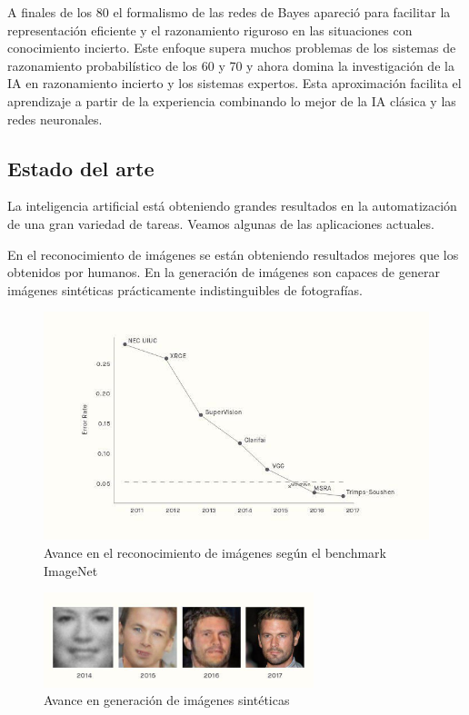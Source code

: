 \documentclass[12pt,a4paper]{article}
\begin{document}
A finales de los 80 el formalismo de las redes de Bayes apareció para facilitar la representación eficiente y el razonamiento riguroso en las situaciones con conocimiento incierto. Este enfoque supera muchos problemas de los sistemas de razonamiento probabilístico de los 60 y 70 y ahora domina la investigación de la IA en razonamiento incierto y los sistemas expertos. Esta aproximación facilita el aprendizaje a partir de la experiencia combinando lo mejor de la IA clásica y las redes neuronales.
\subsection{Estado del arte}
La inteligencia artificial está obteniendo grandes resultados en la automatización de una gran variedad de tareas. Veamos algunas de las aplicaciones actuales.

En el reconocimiento de imágenes se están obteniendo resultados mejores que los obtenidos por humanos. En la generación de imágenes son capaces de generar imágenes sintéticas prácticamente indistinguibles de fotografías.

\begin{figure}[h!]
 \centering
 \includegraphics[width=1.0\textwidth]{grafica.jpg}
 \caption{Avance en el reconocimiento de imágenes según el benchmark ImageNet}
\end{figure}

\begin{figure}[h!]
 \centering
 \includegraphics[width=0.7\textwidth]{fotos.jpg}
 \caption{Avance en generación de imágenes sintéticas}
\end{figure}
\end{document}
